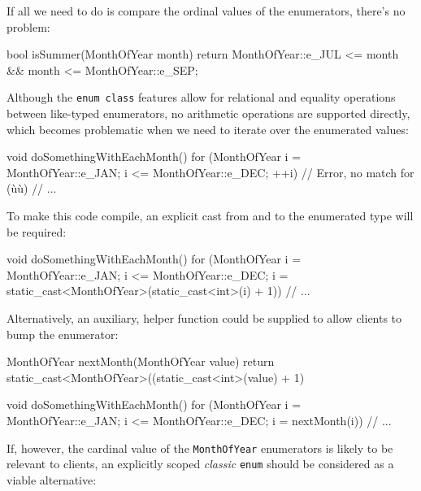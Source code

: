 \noindent If all we need to do is compare the ordinal values of the enumerators,
there's no problem:

\begin{emcppslisting}[emcppsbatch=e15]
bool isSummer(MonthOfYear month)
{
    return MonthOfYear::e_JUL <= month && month <= MonthOfYear::e_SEP;
}
\end{emcppslisting}

\noindent Although the \lstinline!enum!~\lstinline!class! features allow for relational
and equality operations between like-typed enumerators, no arithmetic
operations are supported directly, which becomes problematic when we
need to iterate over the enumerated values:

\begin{emcppslisting}[emcppsbatch=e15,emcppsignore={Entire for block is marked Error}]
void doSomethingWithEachMonth()
{
    for (MonthOfYear i =  MonthOfYear::e_JAN;
                     i <= MonthOfYear::e_DEC;
                   ++i)  // Error, no match for (ù{\codeincomments{++}}ù)
    {
        // ...
    }
}
\end{emcppslisting}

\noindent To make this code compile, an explicit cast from and to the enumerated
type will be required:

\begin{emcppslisting}[emcppsbatch=e15]
void doSomethingWithEachMonth()
{
    for (MonthOfYear i =  MonthOfYear::e_JAN;
                     i <= MonthOfYear::e_DEC;
                     i = static_cast<MonthOfYear>(static_cast<int>(i) + 1))
    {
        // ...
    }
}
\end{emcppslisting}

\noindent Alternatively, an auxiliary, helper function could be supplied to allow
clients to bump the enumerator:

\begin{emcppslisting}[emcppsbatch=e16]
MonthOfYear nextMonth(MonthOfYear value)
{
    return static_cast<MonthOfYear>((static_cast<int>(value) + 1) %
}

void doSomethingWithEachMonth()
{
    for (MonthOfYear i =  MonthOfYear::e_JAN;
                     i <= MonthOfYear::e_DEC;
                     i = nextMonth(i))
    {
        // ...
    }
}
\end{emcppslisting}

\noindent If, however, the cardinal value of the \lstinline!MonthOfYear! enumerators
is likely to be relevant to clients, an explicitly scoped \emph{classic}
\lstinline!enum! should be considered as a viable alternative:

